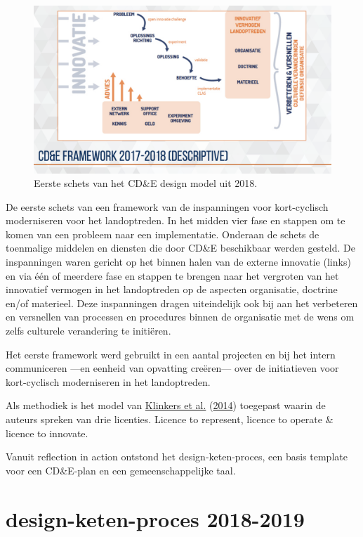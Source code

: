 \documentclass[
]{book}
\begin{document}
\begin{figure}
\includegraphics[width=26.67in]{data/keynote-slides/20200430-CDE-Designprocess/20200430-CDE-Designprocess.020} \caption{Eerste schets van het CD\&E design model uit 2018. }\label{fig:unnamed-chunk-28}
\end{figure}

De eerste schets van een framework van de inspanningen voor kort-cyclisch moderniseren voor het landoptreden. In het midden vier fase en stappen om te komen van een probleem naar een implementatie. Onderaan de schets de toenmalige middelen en diensten die door CD\&E beschikbaar werden gesteld. De inspanningen waren gericht op het binnen halen van de externe innovatie (links) en via één of meerdere fase en stappen te brengen naar het vergroten van het innovatief vermogen in het landoptreden op de aspecten organisatie, doctrine en/of materieel. Deze inspanningen dragen uiteindelijk ook bij aan het verbeteren en versnellen van processen en procedures binnen de organisatie met de wens om zelfs culturele verandering te initiëren.

Het eerste framework werd gebruikt in een aantal projecten en bij het intern communiceren ---en eenheid van opvatting creëren--- over de initiatieven voor kort-cyclisch moderniseren in het landoptreden.

Als methodiek is het model van \protect\hyperlink{ref-klinkers_navigeren_2014}{Klinkers et al.} (\protect\hyperlink{ref-klinkers_navigeren_2014}{2014}) toegepast waarin de auteurs spreken van drie licenties. Licence to represent, licence to operate \& licence to innovate.

Vanuit reflection in action ontstond het design-keten-proces, een basis template voor een CD\&E-plan en een gemeenschappelijke taal.

\hypertarget{design-keten-proces-2018-2019}{%
\section{design-keten-proces 2018-2019}\label{design-keten-proces-2018-2019}}
\end{document}
